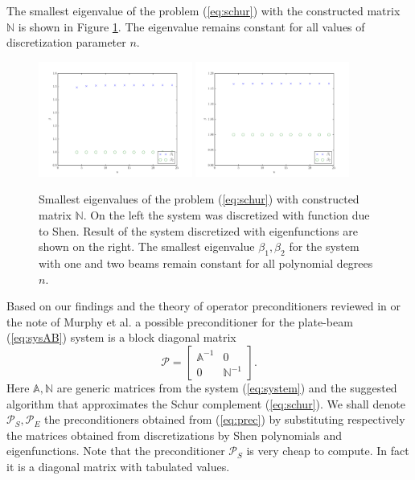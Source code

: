\documentclass{marine_2015}
\begin{document}
The smallest eigenvalue of the problem (\ref{eq:schur}) 
with the constructed matrix $\mathbb{N}$ is shown in Figure \ref{fig:schur}. 
The eigenvalue remains constant for all values of discretization parameter $n$.
 \begin{figure}[h!]
 \centering
 \includegraphics[width=0.45\textwidth]{img/Schur_precond_shen_cond}
 \includegraphics[width=0.45\textwidth]{img/Schur_precond_sine_cond}\\
 \caption{Smallest eigenvalues of the problem (\ref{eq:schur}) with constructed
 matrix $\mathbb{N}$. On the left the system was discretized with function due
 to Shen. Result of the system discretized with eigenfunctions are shown on the
 right. The smallest eigenvalue $\beta_1, \beta_2$ for the system with one and
 two beams remain constant for all polynomial degrees $n$.}
 \label{fig:schur}
 \end{figure}

Based on our findings and the theory of operator preconditioners reviewed in
\cite{kent} or the note of Murphy et al. \cite{golub} a possible preconditioner 
for the plate-beam (\ref{eq:sysAB}) system is a block diagonal matrix
\begin{equation}
\label{eq:prec}
\mathcal{P} = 
    \begin{bmatrix}
      \mathbb{A}^{-1} & 0 \\
      0 & \mathbb{N}^{-1}
    \end{bmatrix}.
\end{equation}
Here $\mathbb{A}, \mathbb{N}$ are generic matrices from the system
(\ref{eq:system}) and the suggested algorithm that approximates the Schur
complement (\ref{eq:schur}). We shall denote $\mathcal{P}_S, \mathcal{P}_E$ the 
preconditioners obtained from (\ref{eq:prec}) by substituting respectively the 
matrices obtained from discretizations by Shen polynomials and eigenfunctions.
Note that the preconditioner $\mathcal{P}_S$ is very cheap to compute. In fact it 
is a diagonal matrix with tabulated values.
\end{document}
